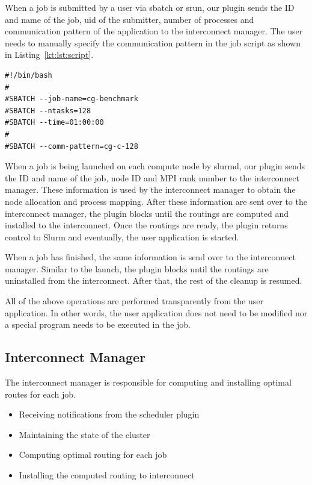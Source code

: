 \documentclass[graybox]{svmult}
\begin{document}
When a job is submitted by a user via sbatch or srun, our plugin sends the ID
and name of the job, uid of the submitter, number of processes and
communication pattern of the application to the interconnect manager. The user
needs to manually specify the communication pattern in the job script as shown
in Listing~\ref{kt:lst:script}.

\begin{lstlisting}[float,caption=An example of a job script,label=kt:lst:script]
#!/bin/bash
#
#SBATCH --job-name=cg-benchmark
#SBATCH --ntasks=128
#SBATCH --time=01:00:00
#
#SBATCH --comm-pattern=cg-c-128
\end{lstlisting}

When a job is being launched on each compute node by slurmd, our plugin sends
the ID and name of the job, node ID and MPI rank number to the interconnect
manager. These information is used by the interconnect manager to obtain the
node allocation and process mapping. After these information are sent over to
the interconnect manager, the plugin blocks until the routings are computed
and installed to the interconnect. Once the routings are ready, the plugin
returns control to Slurm and eventually, the user application is started.

When a job has finished, the same information is send over to the interconnect
manager. Similar to the launch, the plugin blocks until the routings are
uninstalled from the interconnect. After that, the rest of the cleanup is
resumed.

All of the above operations are performed transparently from the user
application. In other words, the user application does not need to be modified
nor a special program needs to be executed in the job.

\subsection{Interconnect Manager}

The interconnect manager is responsible for computing and installing optimal
routes for each job.

\begin{itemize}
    \item Receiving notifications from the scheduler plugin
    \item Maintaining the state of the cluster
    \item Computing optimal routing for each job
    \item Installing the computed routing to interconnect
\end{itemize}
\end{document}

